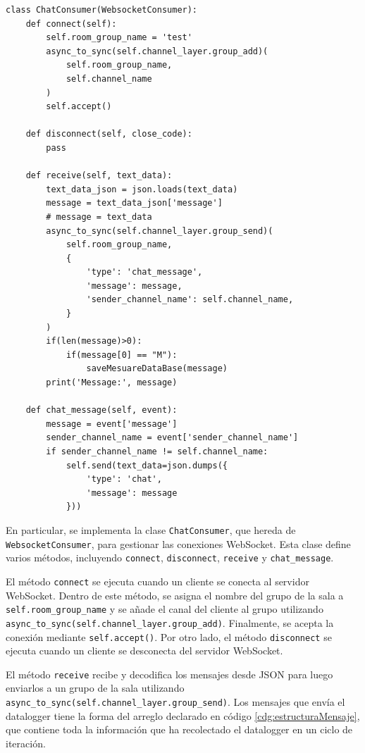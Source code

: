 \begin{lstlisting}[style=pythonstyle, caption={Declaracion de las funciones que utiliza cada consumidor para interactuar con el servidor WebSocket.}, label=cdg:consumer,basicstyle=\ttfamily\fontsize{8}{8}\selectfont]
class ChatConsumer(WebsocketConsumer):
    def connect(self):
        self.room_group_name = 'test'
        async_to_sync(self.channel_layer.group_add)(
            self.room_group_name,
            self.channel_name           
        )
        self.accept()

    def disconnect(self, close_code):
        pass
        
    def receive(self, text_data):
        text_data_json = json.loads(text_data)
        message = text_data_json['message']
        # message = text_data
        async_to_sync(self.channel_layer.group_send)(
            self.room_group_name,
            {
                'type': 'chat_message',
                'message': message,
                'sender_channel_name': self.channel_name,
            }
        )
        if(len(message)>0):
            if(message[0] == "M"):
                saveMesuareDataBase(message)
        print('Message:', message)

    def chat_message(self, event):
        message = event['message']
        sender_channel_name = event['sender_channel_name']
        if sender_channel_name != self.channel_name:
            self.send(text_data=json.dumps({
                'type': 'chat',
                'message': message
            }))
\end{lstlisting}

En particular, se implementa la clase \texttt{ChatConsumer}, que hereda de \texttt{WebsocketConsumer}, para gestionar las conexiones WebSocket. Esta clase define varios métodos, incluyendo \texttt{connect}, \texttt{disconnect}, \texttt{receive} y \texttt{chat\_message}.

El método \texttt{connect} se ejecuta cuando un cliente se conecta al servidor WebSocket. Dentro de este método, se asigna el nombre del grupo de la sala a \texttt{self.room\_group\_name} y se añade el canal del cliente al grupo utilizando \texttt{async\_to\_sync(self.channel\_layer.group\_add)}. Finalmente, se acepta la conexión mediante \texttt{self.accept()}. Por otro lado, el método \texttt{disconnect} se ejecuta cuando un cliente se desconecta del servidor WebSocket.

El método \texttt{receive} recibe y decodifica los mensajes desde JSON para luego enviarlos a un grupo de la sala utilizando \texttt{async\_to\_sync(self.channel\_layer.group\_send)}. Los mensajes que envía el datalogger tiene la forma del arreglo declarado en código \ref{cdg:estructuraMensaje}, que contiene toda la información que ha recolectado el datalogger en un ciclo de iteración.


